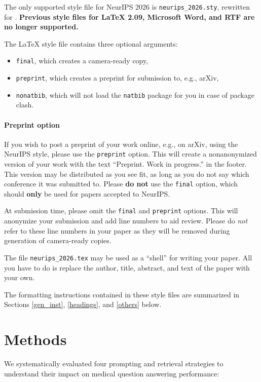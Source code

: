 \documentclass{article}
\begin{document}
The only supported style file for NeurIPS 2026 is \verb+neurips_2026.sty+, rewritten for \LaTeXe{}. \textbf{Previous style files for \LaTeX{} 2.09,  Microsoft Word, and RTF are no longer supported.}


The \LaTeX{} style file contains three optional arguments: 
\begin{itemize}
\item \verb+final+, which creates a camera-ready copy, 
\item \verb+preprint+, which creates a preprint for submission to, e.g., arXiv, \item \verb+nonatbib+, which will not load the \verb+natbib+ package for you in case of package clash.
\end{itemize}


\paragraph{Preprint option}
If you wish to post a preprint of your work online, e.g., on arXiv, using the NeurIPS style, please use the \verb+preprint+ option. This will create a nonanonymized version of your work with the text ``Preprint. Work in progress.'' in the footer. This version may be distributed as you see fit, as long as you do not say which conference it was submitted to. Please \textbf{do not} use the \verb+final+ option, which should \textbf{only} be used for papers accepted to NeurIPS.


At submission time, please omit the \verb+final+ and \verb+preprint+ options. This will anonymize your submission and add line numbers to aid review. Please do \emph{not} refer to these line numbers in your paper as they will be removed during generation of camera-ready copies.


The file \verb+neurips_2026.tex+ may be used as a ``shell'' for writing your paper. All you have to do is replace the author, title, abstract, and text of the paper with your own.


The formatting instructions contained in these style files are summarized in Sections \ref{gen_inst}, \ref{headings}, and \ref{others} below.


\section{Methods}
We systematically evaluated four prompting and retrieval strategies to understand their impact on medical question answering performance:
\end{document}
